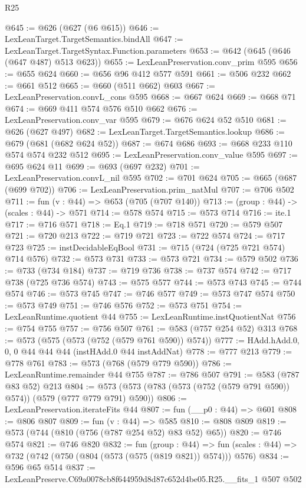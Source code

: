 \begin{lexlean}{R25}
\begin{coremodule}
@645 := @626 (@627 (@6 @615))
@646 := LexLeanTarget.TargetSemantics.bindAll
@647 := LexLeanTarget.TargetSyntax.Function.parameters
@653 := @642 (@645 (@646 (@647 @487) @513 @623))
@655 := LexLeanPreservation.conv_prim @595
@656 := @655 @624
@660 := @656 @96 @412 @577 @591
@661 := @506 @232
@662 := @661 @512
@665 := @660 (@511 @662) @603
@667 := LexLeanPreservation.convL_cons @595
@668 := @667 @624
@669 := @668 @71
@674 := @669 @411 @574 @576 @510 @662
@676 := LexLeanPreservation.conv_var @595
@679 := @676 @624 @52 @510
@681 := @626 (@627 @497)
@682 := LexLeanTarget.TargetSemantics.lookup
@686 := @679 (@681 (@682 @624 @52))
@687 := @674 @686
@693 := @668 @233 @110 @574 @574 @232 @512
@695 := LexLeanPreservation.conv_value @595
@697 := @695 @624 @11
@699 := @693 (@697 @232)
@701 := LexLeanPreservation.convL_nil @595
@702 := @701 @624
@705 := @665 (@687 (@699 @702))
@706 := LexLeanPreservation.prim_natMul
@707 := @706 @502
@711 := fun (v : @44) => @653 (@705 (@707 @140))
@713 := (group : @44) -> (scales : @44) -> @571
@714 := @578 @574
@715 := @573 @714
@716 := ite.{1}
@717 := @716 @571
@718 := Eq.{1}
@719 := @718 @571
@720 := @579 @507
@721 := @720 @213
@722 := @719 @721
@723 := @722 @574
@724 := @717 @723
@725 := instDecidableEqBool
@731 := @715 (@724 (@725 @721 @574) @714 @576)
@732 := @573 @731
@733 := @573 @721
@734 := @579 @502
@736 := @733 (@734 @184)
@737 := @719 @736
@738 := @737 @574
@742 := @717 @738 (@725 @736 @574)
@743 := @575 @577
@744 := @573 @743
@745 := @744 @574
@746 := @573 @745
@747 := @746 @577
@749 := @573 @747 @574
@750 := @573 @749
@751 := @746 @576
@752 := @573 @751
@754 := LexLeanRuntime.quotient @44
@755 := LexLeanRuntime.instQuotientNat
@756 := @754 @755
@757 := @756 @507
@761 := @583 (@757 @254 @52) @313
@768 := @573 (@575 (@573 (@752 (@579 @761 @590)) @574))
@777 := HAdd.hAdd.{0, 0, 0} @44 @44 @44 (instHAdd.{0} @44 instAddNat)
@778 := @777 @213
@779 := @778 @761
@783 := @573 (@768 (@579 @779 @590))
@786 := LexLeanRuntime.remainder @44 @755
@787 := @786 @507
@791 := @583 (@787 @83 @52) @213
@804 := @573 (@573 (@783 (@573 (@752 (@579 @791 @590)) @574)) (@579 (@777 @779 @791) @590))
@806 := LexLeanPreservation.iterateFits @44
@807 := fun (__p0 : @44) => @601
@808 := @806 @807
@809 := fun (v : @44) => @585
@810 := @808 @809
@819 := @573 (@744 (@810 (@756 (@787 @254 @52) @83 @52) @65))
@820 := @746 @574
@821 := @746 @820
@832 := fun (group : @44) =>
  fun (scales : @44) => @732 (@742 (@750 (@804 (@573 (@575 (@819 @821)) @574))) @576)
@834 := @596 @65 @514
@837 := LexLeanPreserve.C69a0078cb8f644959d8d87c652d4be05.R25.__fits_1 @507 @502

\end{coremodule}
\end{lexlean}
